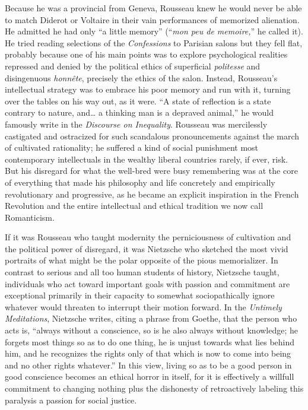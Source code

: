 \documentclass[a4paper,12pt,margin=.5in]{article}
\begin{document}
Because he was a provincial from Geneva, Rousseau knew he would never be
able to match Diderot or Voltaire in their vain performances of
memorized alienation. He admitted he had only ``a little memory''
(``\emph{mon peu de memoire,}'' he called it). He tried reading
selections of the \emph{Confessions} to Parisian salons but they fell
flat, probably because one of his main points was to explore
psychological realities repressed and denied by the political ethics of
superficial \emph{politesse} and disingenuous \emph{honnête}, precisely
the ethics of the salon. Instead, Rousseau's intellectual strategy was
to embrace his poor memory and run with it, turning over the tables on
his way out, as it were. ``A state of reflection is a state contrary to
nature, and\ldots{} a thinking man is a depraved animal,'' he would
famously write in the \emph{Discourse on Inequality}. Rousseau was
mercilessly castigated and ostracized for such scandalous pronouncements
against the march of cultivated rationality; he suffered a kind of
social punishment most contemporary intellectuals in the wealthy liberal
countries rarely, if ever, risk. But his disregard for what the
well-bred were busy remembering was at the core of everything that made
his philosophy and life concretely and empirically revolutionary and
progressive, as he became an explicit inspiration in the French
Revolution and the entire intellectual and ethical tradition we now call
Romanticism.

If it was Rousseau who taught modernity the perniciousness of
cultivation and the political power of disregard, it was Nietzsche who
sketched the most vivid portraits of what might be the polar opposite of
the pious memorializer. In contrast to serious and all too human
students of history, Nietzsche taught, individuals who act toward
important goals with passion and commitment are exceptional primarily in
their capacity to somewhat sociopathically ignore whatever would
threaten to interrupt their motion forward. In the \emph{Untimely
Meditations}, Nietzsche writes, citing a phrase from Goethe, that the
person who acts is, ``always without a conscience, so is he also always
without knowledge; he forgets most things so as to do one thing, he is
unjust towards what lies behind him, and he recognizes the rights only
of that which is now to come into being and no other rights whatever.''
In this view, living so as to be a good person in good conscience
becomes an ethical horror in itself, for it is effectively a willfull
commitment to changing nothing plus the dishonesty of retroactively
labeling this paralysis a passion for social justice.
\end{document}
